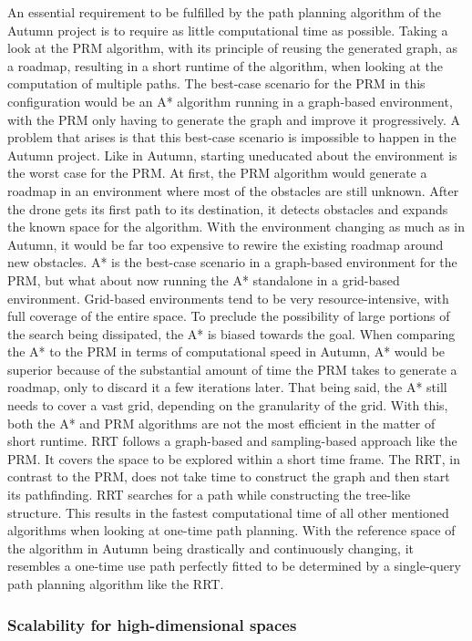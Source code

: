 An essential requirement to be fulfilled by the path planning algorithm of the Autumn project is to require as little computational time as possible. Taking a look at the PRM algorithm, with its principle of reusing the generated graph, as a roadmap, resulting in a short runtime of the algorithm, when looking at the computation of multiple paths. The best-case scenario for the PRM in this configuration would be an A* algorithm running in a graph-based environment, with the PRM only having to generate the graph and improve it progressively. A problem that arises is that this best-case scenario is impossible to happen in the Autumn project. Like in Autumn, starting uneducated about the environment is the worst case for the PRM. At first, the PRM algorithm would generate a roadmap in an environment where most of the obstacles are still unknown. After the drone gets its first path to its destination, it detects obstacles and expands the known space for the algorithm. With the environment changing as much as in Autumn, it would be far too expensive to rewire the existing roadmap around new obstacles. A* is the best-case scenario in a graph-based environment for the PRM, but what about now running the A* standalone in a grid-based environment. Grid-based environments tend to be very resource-intensive, with full coverage of the entire space. To preclude the possibility of large portions of the search being dissipated, the A* is biased towards the goal. When comparing the A* to the PRM in terms of computational speed in Autumn, A* would be superior because of the substantial amount of time the PRM takes to generate a roadmap, only to discard it a few iterations later. That being said, the A* still needs to cover a vast grid, depending on the granularity of the grid. With this, both the A* and PRM algorithms are not the most efficient in the matter of short runtime. RRT follows a graph-based and sampling-based approach like the PRM. It covers the space to be explored within a short time frame. The RRT, in contrast to the PRM, does not take time to construct the graph and then start its pathfinding. RRT searches for a path while constructing the tree-like structure. This results in the fastest computational time of all other mentioned algorithms when looking at one-time path planning. With the reference space of the algorithm in Autumn being drastically and continuously changing, it resembles a one-time use path perfectly fitted to be determined by a single-query path planning algorithm like the RRT.

\subsubsection{Scalability for high-dimensional spaces}

